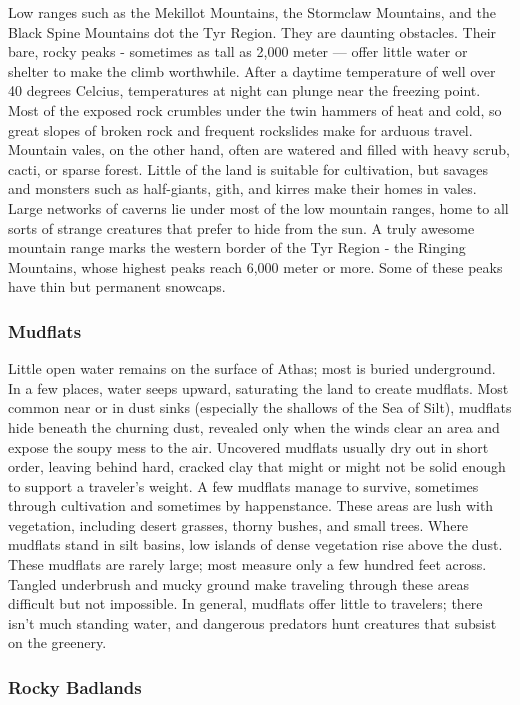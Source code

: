 \begin{multicols}{2}
Low ranges such as the Mekillot Mountains, the Stormclaw Mountains, and the
Black Spine Mountains dot the Tyr Region. They are daunting obstacles. Their
bare, rocky peaks - sometimes as tall as 2,000 meter — offer little water or
shelter to make the climb worthwhile. After a daytime temperature of well over
40 degrees Celcius, temperatures at night can plunge near the freezing point.
Most of the exposed rock crumbles under the twin hammers of heat and cold, so
great slopes of broken rock and frequent rockslides make for arduous travel.
Mountain vales, on the other hand, often are watered and filled with heavy
scrub, cacti, or sparse forest. Little of the land is suitable for
cultivation, but savages and monsters such as half-giants, gith, and kirres
make their homes in vales. Large networks of caverns lie under most of the low
mountain ranges, home to all sorts of strange creatures that prefer to hide
from the sun. A truly awesome mountain range marks the western border of the
Tyr Region - the Ringing Mountains, whose highest peaks reach 6,000 meter or
more. Some of these peaks have thin but permanent snowcaps.

\subsubsection{Mudflats}

Little open water remains on the surface of Athas; most is buried underground.
In a few places, water seeps upward, saturating the land to create mudflats.
Most common near or in dust sinks (especially the shallows of the Sea of Silt),
mudflats hide beneath the churning dust, revealed only when the winds clear an
area and expose the soupy mess to the air. Uncovered mudflats usually dry out
in short order, leaving behind hard, cracked clay that might or might not be
solid enough to support a traveler's weight. A few mudflats manage to survive,
sometimes through cultivation and sometimes by happenstance. These areas are
lush with vegetation, including desert grasses, thorny bushes, and small trees.
Where mudflats stand in silt basins, low islands of dense vegetation rise above
the dust. These mudflats are rarely large; most measure only a few hundred feet
across. Tangled underbrush and mucky ground make traveling through these areas
difficult but not impossible. In general, mudflats offer little to travelers;
there isn't much standing water, and dangerous predators hunt creatures that
subsist on the greenery.

\subsubsection{Rocky Badlands}


\end{multicols}
